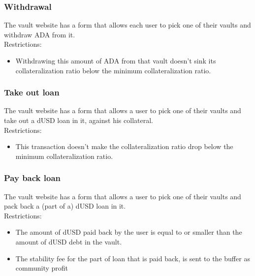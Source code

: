 \documentclass{article} %
\begin{document}
\subsubsection{Withdrawal}

The vault website has a form that allows each user to pick one of their vaults
and withdraw ADA from it. \\

Restrictions:
\begin{itemize}
  \item Withdrawing this amount of ADA from that vault doesn't sink its
    collateralization ratio below the minimum collateralization ratio.
\end{itemize}

\subsubsection{Take out loan}

The vault website has a form that allows a user to pick one of their vaults and
take out a dUSD loan in it, against his collateral. \\

Restrictions:
\begin{itemize}
  \item This transaction doesn't make the collateralization ratio drop below the
    minimum collateralization ratio.
\end{itemize}


\subsubsection{Pay back loan}

The vault website has a form that allows a user to pick one of their vaults and
pack back a (part of a) dUSD loan in it. \\

Restrictions:
\begin{itemize}
  \item The amount of dUSD paid back by the user is equal to or smaller than the
    amount of dUSD debt in the vault.
  \item The stability fee for the part of loan that is paid back, is sent to the
    buffer as community profit
\end{itemize}
\end{document}
